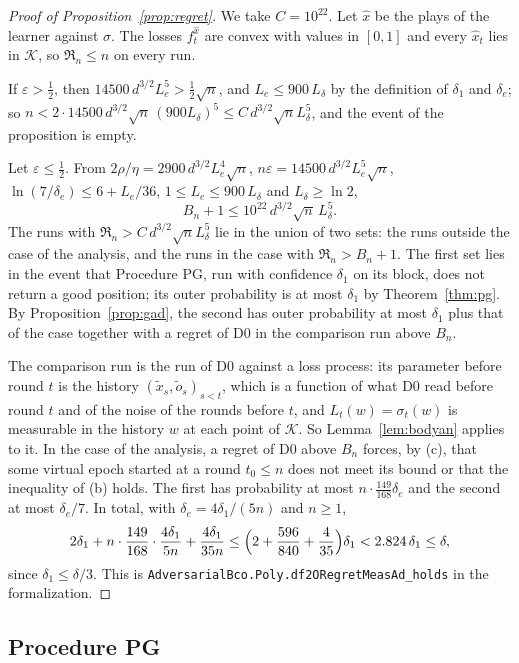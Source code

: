 \documentclass[11pt]{amsart}
\theoremstyle{definition}
\numberwithin{equation}{section}
\newcommand{\cK}{\mathcal{K}}
\newcommand{\Reg}{\mathfrak{R}}
\begin{document}
\begin{proof}[Proof of Proposition~\ref{prop:regret}]
We take $C=10^{22}$. Let $\hat x$ be the plays of the learner against $\sigma$. The losses $f^{\hat x}_t$ are convex with values in $[0,1]$ and every $\hat x_t$ lies in $\cK$, so $\Reg_n\le n$ on every run.

If $\varepsilon>\frac12$, then $14500\,d^{3/2}L_e^5>\frac12\sqrt n$, and $L_e\le900\,L_\delta$ by the definition of $\delta_1$ and $\delta_e$; so $n<2\cdot14500\,d^{3/2}\sqrt n\,(900L_\delta)^5\le C\,d^{3/2}\sqrt nL_\delta^5$, and the event of the proposition is empty.

Let $\varepsilon\le\frac12$. From $2\rho/\eta=2900\,d^{3/2}L_e^4\sqrt n$, $n\varepsilon=14500\,d^{3/2}L_e^5\sqrt n$, $\ln(7/\delta_e)\le6+L_e/36$, $1\le L_e\le900\,L_\delta$ and $L_\delta\ge\ln2$,
\[
B_n+1\le10^{22}\,d^{3/2}\sqrt n\,L_\delta^5 .
\]
The runs with $\Reg_n>C\,d^{3/2}\sqrt nL_\delta^5$ lie in the union of two sets: the runs outside the case of the analysis, and the runs in the case with $\Reg_n>B_n+1$. The first set lies in the event that Procedure PG, run with confidence $\delta_1$ on its block, does not return a good position; its outer probability is at most $\delta_1$ by Theorem~\ref{thm:pg}. By Proposition~\ref{prop:gad}, the second has outer probability at most $\delta_1$ plus that of the case together with a regret of D0 in the comparison run above $B_n$.

The comparison run is the run of D0 against a loss process: its parameter before round $t$ is the history $(\tilde x_s,\tilde o_s)_{s<t}$, which is a function of what D0 read before round $t$ and of the noise of the rounds before $t$, and $L_t(w)=\sigma_t(w)$ is measurable in the history $w$ at each point of $\cK$. So Lemma~\ref{lem:bodyan} applies to it. In the case of the analysis, a regret of D0 above $B_n$ forces, by (c), that some virtual epoch started at a round $t_0\le n$ does not meet its bound or that the inequality of (b) holds. The first has probability at most $n\cdot\frac{149}{168}\delta_e$ and the second at most $\delta_e/7$. In total, with $\delta_e=4\delta_1/(5n)$ and $n\ge1$,
\[
2\delta_1+n\cdot\frac{149}{168}\cdot\frac{4\delta_1}{5n}+\frac{4\delta_1}{35n}\le\Bigl(2+\frac{596}{840}+\frac4{35}\Bigr)\delta_1<2.824\,\delta_1\le\delta,
\]
since $\delta_1\le\delta/3$.
This is \texttt{AdversarialBco.Poly.df2ORegretMeasAd\_holds} in the formalization.
\end{proof}

\subsection{Procedure PG}\label{app:body-pg}
\end{document}
